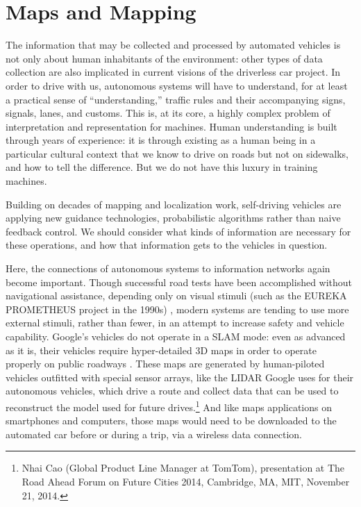 

\section{Maps and Mapping}

The information that may be collected and processed by automated
vehicles is not only about human inhabitants of the environment: other
types of data collection are also implicated in current
visions of the driverless car project. In order to drive with us,
autonomous systems will have to understand,
for at least a practical sense of ``understanding,'' traffic rules and
their accompanying signs, signals, lanes, and customs. This is, at its
core, a highly complex problem of interpretation and representation
for machines. Human understanding is built
through years of experience: it is through existing as a human being
in a particular cultural context that we know to drive on roads but
not on sidewalks, and how to tell the difference. But we do not have
this luxury in training machines. %


Building on decades of mapping and localization work, self-driving
vehicles are applying new guidance technologies, probabilistic
algorithms rather than naive feedback control. We should consider what
kinds of information are necessary for these operations, and how that
information gets to the vehicles in question.

Here, the connections of autonomous systems to information networks
again become important. Though successful
road tests have been accomplished without navigational assistance,
depending only on visual stimuli (such as the EUREKA PROMETHEUS project
in the 1990s) \cite{ulmerVITA}, modern systems are tending to use more external
stimuli, rather than fewer, in an attempt to increase safety and
vehicle capability. Google's vehicles do not operate in a SLAM mode: even as
advanced as it is, their vehicles require
hyper-detailed 3D maps in order to operate properly on public
roadways \cite{gomesObstacles}. These maps are generated by human-piloted vehicles outfitted with
special sensor arrays, like the LIDAR Google uses for their autonomous
vehicles, which drive a route and collect data that can be used to
reconstruct the model used for future drives.\footnote{Nhai Cao
  (Global Product Line Manager at TomTom), presentation at The Road
  Ahead Forum on Future Cities 2014, Cambridge, MA, MIT, November 21,
  2014.} And like maps applications on smartphones and computers,
those maps would need to be downloaded to the automated car before or
during a trip, via a wireless data connection.

